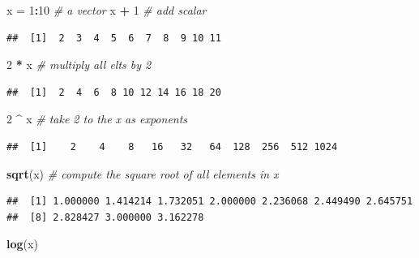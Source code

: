 \documentclass[]{book}
\newenvironment{Shaded}{\begin{snugshade}}{\end{snugshade}}
\newcommand{\KeywordTok}[1]{\textcolor[rgb]{0.13,0.29,0.53}{\textbf{#1}}}
\newcommand{\DecValTok}[1]{\textcolor[rgb]{0.00,0.00,0.81}{#1}}
\newcommand{\StringTok}[1]{\textcolor[rgb]{0.31,0.60,0.02}{#1}}
\newcommand{\CommentTok}[1]{\textcolor[rgb]{0.56,0.35,0.01}{\textit{#1}}}
\newcommand{\OperatorTok}[1]{\textcolor[rgb]{0.81,0.36,0.00}{\textbf{#1}}}
\newcommand{\NormalTok}[1]{#1}
\theoremstyle{definition}
\theoremstyle{definition}
\theoremstyle{definition}
\theoremstyle{remark}
\begin{document}
\begin{Shaded}
\begin{Highlighting}[]
\NormalTok{x =}\StringTok{ }\DecValTok{1}\OperatorTok{:}\DecValTok{10}  \CommentTok{# a vector}
\NormalTok{x }\OperatorTok{+}\StringTok{ }\DecValTok{1}     \CommentTok{# add scalar}
\end{Highlighting}
\end{Shaded}

\begin{verbatim}
##  [1]  2  3  4  5  6  7  8  9 10 11
\end{verbatim}

\begin{Shaded}
\begin{Highlighting}[]
\DecValTok{2} \OperatorTok{*}\StringTok{ }\NormalTok{x     }\CommentTok{# multiply all elts by 2}
\end{Highlighting}
\end{Shaded}

\begin{verbatim}
##  [1]  2  4  6  8 10 12 14 16 18 20
\end{verbatim}

\begin{Shaded}
\begin{Highlighting}[]
\DecValTok{2} \OperatorTok{^}\StringTok{ }\NormalTok{x     }\CommentTok{# take 2 to the x as exponents}
\end{Highlighting}
\end{Shaded}

\begin{verbatim}
##  [1]    2    4    8   16   32   64  128  256  512 1024
\end{verbatim}

\begin{Shaded}
\begin{Highlighting}[]
\KeywordTok{sqrt}\NormalTok{(x)   }\CommentTok{# compute the square root of all elements in x}
\end{Highlighting}
\end{Shaded}

\begin{verbatim}
##  [1] 1.000000 1.414214 1.732051 2.000000 2.236068 2.449490 2.645751
##  [8] 2.828427 3.000000 3.162278
\end{verbatim}

\begin{Shaded}
\begin{Highlighting}[]
\KeywordTok{log}\NormalTok{(x)}
\end{Highlighting}
\end{Shaded}
\end{document}
